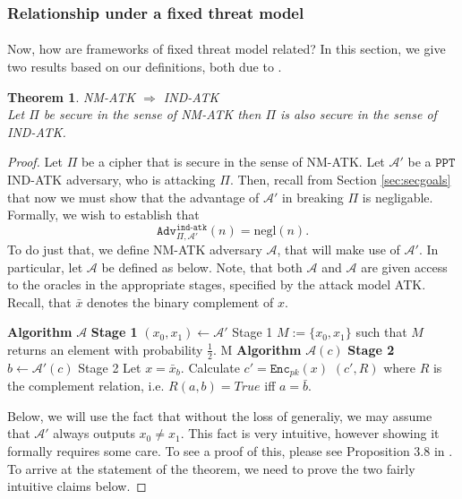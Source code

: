 \documentclass{article}
\newtheorem{theorem}{Theorem}[section]
\theoremstyle{definition}
\newcommand{\Enc}{\texttt{Enc}}
\newcommand{\A}{\mathcal{A}}
\newcommand{\PPT}{\texttt{PPT}}
\newcommand{\negl}{\text{negl}}
\newcommand{\Adv}[2]{\texttt{Adv}^{\texttt{#1}}_{#2}}
\begin{document}
\subsubsection{Relationship under a fixed threat model}
\paragraph{} Now, how are frameworks of fixed threat model related? In this
section, we give two results based on our definitions, both due to \cite{bellaresecurityrelations}.
\begin{theorem}{NM-ATK $\Rightarrow$ IND-ATK}\\
  Let $\Pi$ be secure in the sense of NM-ATK then $\Pi$ is also secure in the
  sense of IND-ATK.
\end{theorem}
\begin{proof}
  Let $\Pi$ be a cipher that is secure in the sense of NM-ATK. Let $\A'$ be
  a $\PPT$ IND-ATK adversary, who is attacking $\Pi$. Then, recall from Section
  \ref{sec:secgoals} that now we must show that the advantage of $\A'$ in
  breaking $\Pi$ is negligable. Formally, we wish to establish that
  \[
    \Adv{ind-atk}{\Pi, \A'}(n) = \negl(n).
  \]
  To do just that, we define NM-ATK adversary $\A$, that will make use of $\A'$.
  In particular, let $\A$ be defined as below. Note, that both $\A$ and $\A$ are
  given access to the oracles in the appropriate stages, specified by the attack
  model ATK. Recall, that $\bar{x}$ denotes the binary complement of $x$.\\
  \begin{algorithmic}
    \State \textbf{Algorithm} $\A$ \textbf{Stage 1}
    \State $(x_0, x_1) \leftarrow \A'$ Stage 1
    \State $M:= \{x_0, x_1\}$ such that $M$ returns an element with probability $\frac12$.
    \State \Return M
    \State
    \State \textbf{Algorithm} $\A(c)$ \textbf{Stage 2}
    \State $b \leftarrow \A'(c)$ Stage 2
    \State Let $x = \bar{x}_b$. Calculate $c' = \Enc_{pk}(x)$
    \State \Return $(c', R)$ where $R$ is the complement relation, i.e. $R(a,
    b) = True$ iff $a = \bar{b}$.
    \State
  \end{algorithmic}
  Below, we will use the fact that without the loss of generaliy, we may assume
  that $\A'$ always outputs $x_0 \neq x_1$. This fact is very intuitive, however
  showing it formally requires some care. To see a proof of this, please see
  Proposition 3.8 in \cite{bellaresecurityrelations}. To arrive at the statement
  of the theorem, we need to prove the two fairly intuitive claims below.

\end{proof}
\end{document}
